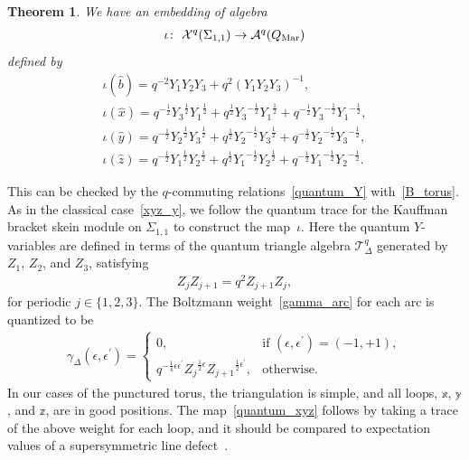 \documentclass[pdftex]{sigma}
\numberwithin{equation}{section}
\newtheorem{Theorem}{Theorem}[section]
\begin{document}
\begin{Theorem} \label{thm:q_torus} We have an embedding of algebra
 \begin{gather*}
 \iota\colon \ \mathcal{X}^q(\Sigma_{1,1}) \to \mathcal{A}^q(Q_{\text{\rm Mar}})
 \end{gather*}
 defined by
 \begin{gather}
\iota(\hat{b}) = q^{-2} Y_1 Y_2 Y_3 + q^2 ( Y_1 Y_2 Y_3 )^{-1} ,\nonumber \\
 \iota(\hat{x}) = q^{-\frac{1}{2}} {Y_3}^{\frac{1}{2}} {Y_1}^{\frac{1}{2}} + q^{\frac{1}{2}} {Y_3}^{-\frac{1}{2}} {Y_1}^{\frac{1}{2}} + q^{-\frac{1}{2}} {Y_3}^{-\frac{1}{2}} {Y_1}^{-\frac{1}{2}} ,\nonumber \\
 \iota(\hat{y}) = q^{-\frac{1}{2}} {Y_2}^{\frac{1}{2}} {Y_3}^{\frac{1}{2}} + q^{\frac{1}{2}} {Y_2}^{-\frac{1}{2}} {Y_3}^{\frac{1}{2}} + q^{-\frac{1}{2}} {Y_2}^{-\frac{1}{2}} {Y_3}^{-\frac{1}{2}} ,\nonumber \\
 \iota(\hat{z}) = q^{-\frac{1}{2}} {Y_1}^{\frac{1}{2}} {Y_2}^{\frac{1}{2}} + q^{\frac{1}{2}} {Y_1}^{-\frac{1}{2}} {Y_2}^{\frac{1}{2}} + q^{-\frac{1}{2}} {Y_1}^{-\frac{1}{2}} {Y_2}^{-\frac{1}{2}} .\label{quantum_xyz}
 \end{gather}
\end{Theorem}

This can be checked by the $q$-commuting relations~\eqref{quantum_Y} with~\eqref{B_torus}. As in the classical case~\eqref{xyz_y}, we follow the quantum trace for the Kauffman bracket skein module on $\Sigma_{1,1}$ to construct the map~$\iota$. Here the quantum $Y$-variables are defined in terms of the quantum triangle algebra $\mathcal{T}^q_\Delta$ generated by $Z_1$, $Z_2$, and $Z_3$, satisfying
\begin{gather*}
 {Z}_j {Z}_{j+1} = q^2 {Z}_{j+1} {Z}_j ,
\end{gather*}
for periodic $j\in \{ 1, 2, 3 \}$. The Boltzmann weight~\eqref{gamma_arc} for each arc is quantized to be
\begin{gather*}
 \gamma_\Delta(\epsilon, \epsilon^\prime) =
 \begin{cases}
 0 , & \text{if $(\epsilon, \epsilon^\prime)=(-1, +1)$}, \\
 q^{-\frac{1}{4} \epsilon \epsilon^\prime} {Z_{ j}}^{\frac{1}{2}\epsilon} {Z_{ j+1}}^{\frac{1}{2}\epsilon^\prime}, & \text{otherwise}.
 \end{cases}
\end{gather*}
In our cases of the punctured torus, the triangulation is simple, and all loops, $\mathbb{x}$, $\mathbb{y}$, and $\mathbb{z}$, are in good positions. The map~\eqref{quantum_xyz} follows by taking a trace of the above weight for each loop, and it should be compared to expectation values of a supersymmetric line defect~\cite{GaioMoorNeit13a}.
\end{document}
